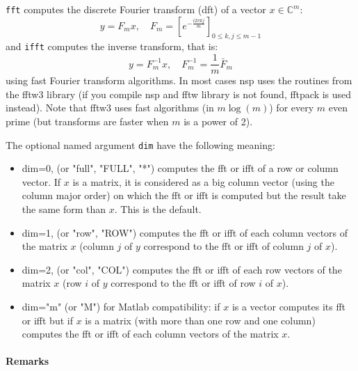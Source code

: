 \begin{mandescription}

\verb+fft+ computes the discrete Fourier transform (dft) of a vector $x \in {\mathbb C}^m$:
$$
 y = F_m x, \quad  F_m = [ e^{-\frac{i 2 \pi k j}{m}} ]_{0 \le k, j \le m-1}
$$
and \verb+ifft+ computes the inverse transform, that is:
$$
 y = F_m^{-1} x, \quad  F_m^{-1} = \frac{1}{m} \bar{F}_m 
$$
using fast Fourier transform algorithms. In most cases nsp uses the routines from the fftw3 
library (if you compile nsp and fftw library is not found, fftpack is used instead). Note 
that fftw3 uses fast algorithms (in $m \log(m)$) for every $m$ even prime (but transforms 
are faster when $m$ is a power of 2).

The optional named argument \verb+dim+ have the following meaning:
\begin{itemize}
\item dim=0, (or "full", "FULL", "*") computes the fft or ifft of a row or column vector. If $x$ is a 
matrix, it is considered as a big column vector (using the column major order) on which the fft or 
ifft is computed but the result take the same form than $x$. This is the default.
\item dim=1, (or "row", "ROW") computes the fft or ifft of each column vectors of the matrix $x$ (column $j$
of $y$ correspond to the fft or ifft of column $j$ of $x$).
\item dim=2, (or "col", "COL") computes the fft or ifft of each row vectors of the matrix $x$ (row $i$
of $y$ correspond to the fft or ifft of row $i$ of $x$).
\item dim="m" (or "M") for Matlab compatibility: if $x$ is a vector computes its fft or ifft but if
$x$ is a matrix (with more than one row and one column) computes the fft or ifft of each column vectors 
of the matrix $x$.
\end{itemize}

\paragraph{Remarks}


\end{mandescription}
